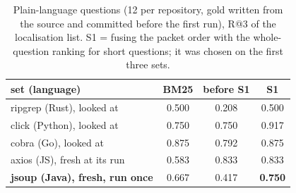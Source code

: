 \begin{table}[t]
\centering
\small
\caption{Plain-language questions (12 per repository, gold written from the source and committed
before the first run), R@3 of the localisation list. S1 = fusing the packet order with the
whole-question ranking for short questions; it was chosen on the first three sets.}
\label{tab:plain}
\begin{tabular}{@{}lccc@{}}
\toprule
set (language) & BM25 & before S1 & S1\\
\midrule
ripgrep (Rust), looked at & 0.500 & 0.208 & 0.500\\
click (Python), looked at & 0.750 & 0.750 & 0.917\\
cobra (Go), looked at & 0.875 & 0.792 & 0.875\\
axios (JS), fresh at its run & 0.583 & 0.833 & 0.833\\
\textbf{jsoup (Java), fresh, run once} & 0.667 & 0.417 & \textbf{0.750}\\
\bottomrule
\end{tabular}
\end{table}
